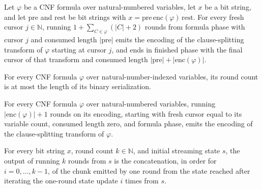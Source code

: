 \begin{lemma}
\label{Complexity.satStreamRun_formula}
\leanok
{}
Let $\varphi$ be a CNF formula over natural-numbered variables, let $x$ be a bit string,
and let $\mathrm{pre}$ and $\mathrm{rest}$ be bit strings with
$x=\mathrm{pre}\,\mathrm{enc}(\varphi)\,\mathrm{rest}$. For every fresh cursor
$j\in\mathbb{N}$, running $1+\sum_{C\in\varphi}(|C|+2)$ rounds from formula phase with
cursor $j$ and consumed length $|\mathrm{pre}|$ emits the encoding of the
clause-splitting transform of $\varphi$ starting at cursor $j$, and ends in finished
phase with the final cursor of that transform and consumed length
$|\mathrm{pre}|+|\mathrm{enc}(\varphi)|$.
\end{lemma}

\begin{lemma}
\label{Complexity.satStreamCount_le}
\leanok
{}
For every CNF formula $\varphi$ over natural-number-indexed variables, its round count
is at most the length of its binary serialization.
\end{lemma}

\begin{lemma}
\label{Complexity.satStreamRun_serialize}
\leanok
{}
For every CNF formula $\varphi$ over natural-numbered variables, running
$|\mathrm{enc}(\varphi)|+1$ rounds on its encoding, starting with fresh cursor equal to
its variable count, consumed length zero, and formula phase, emits the encoding of the
clause-splitting transform of $\varphi$.
\end{lemma}

\begin{lemma}
\label{Complexity.satStreamRun_output}
\leanok
{}
For every bit string $x$, round count $k\in\mathbb{N}$, and initial streaming state $s$,
the output of running $k$ rounds from $s$ is the concatenation, in order for
$i=0,\ldots,k-1$, of the chunk emitted by one round from the state reached after
iterating the one-round state update $i$ times from $s$.
\end{lemma}

